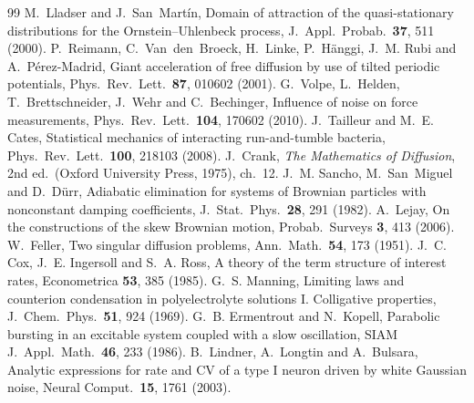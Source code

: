 \documentclass[11pt]{article}
\numberwithin{equation}{section}
\begin{document}
\begin{thebibliography}{99}
 M.~Lladser and J.~San~Mart\'in, Domain of attraction of the quasi-stationary distributions
  for the Ornstein--Uhlenbeck process, J.~Appl.\ Probab.\ \textbf{37}, 511 (2000).
 P.~Reimann, C.~Van~den~Broeck, H.~Linke, P.~H\"anggi, J.~M. Rubi and A.~P\'erez-Madrid,
  Giant acceleration of free diffusion by use of tilted periodic potentials, Phys.\ Rev.\ Lett.\ \textbf{87},
  010602 (2001).
 G.~Volpe, L.~Helden, T.~Brettschneider, J.~Wehr and C.~Bechinger, Influence of noise on force
  measurements, Phys.\ Rev.\ Lett.\ \textbf{104}, 170602 (2010).
 J.~Tailleur and M.~E. Cates, Statistical mechanics of interacting run-and-tumble bacteria,
  Phys.\ Rev.\ Lett.\ \textbf{100}, 218103 (2008).
 J.~Crank, \emph{The Mathematics of Diffusion}, 2nd ed.\ (Oxford University Press, 1975), ch.~12.
 J.~M. Sancho, M.~San~Miguel and D.~D\"urr, Adiabatic elimination for systems of Brownian particles
  with nonconstant damping coefficients, J.~Stat.\ Phys.\ \textbf{28}, 291 (1982).
 A.~Lejay, On the constructions of the skew Brownian motion, Probab.\ Surveys \textbf{3}, 413 (2006).
 W.~Feller, Two singular diffusion problems, Ann.\ Math.\ \textbf{54}, 173 (1951).
 J.~C. Cox, J.~E. Ingersoll and S.~A. Ross, A theory of the term structure of interest rates,
  Econometrica \textbf{53}, 385 (1985).
 G.~S. Manning, Limiting laws and counterion condensation in polyelectrolyte solutions I.
  Colligative properties, J.~Chem.\ Phys.\ \textbf{51}, 924 (1969).
 G.~B. Ermentrout and N.~Kopell, Parabolic bursting in an excitable system coupled with a slow
  oscillation, SIAM J.~Appl.\ Math.\ \textbf{46}, 233 (1986).
 B.~Lindner, A.~Longtin and A.~Bulsara, Analytic expressions for rate and CV of a type I neuron
  driven by white Gaussian noise, Neural Comput.\ \textbf{15}, 1761 (2003).
\end{thebibliography}
\end{document}
